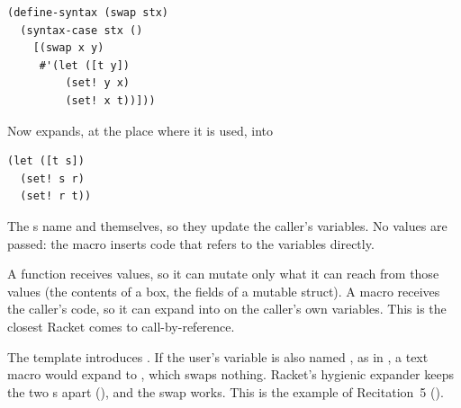 \begin{lstlisting}
(define-syntax (swap stx)
  (syntax-case stx ()
    [(swap x y)
     #'(let ([t y])
         (set! y x)
         (set! x t))]))
\end{lstlisting}
Now  expands, at the place where it is used, into
\begin{lstlisting}
(let ([t s])
  (set! s r)
  (set! r t))
\end{lstlisting}
The s name  and  themselves, so they update the caller's variables. No values are passed: the macro inserts code that refers to the variables directly.

\begin{keypoint}
A function receives values, so it can mutate only what it can reach from those values (the contents of a box, the fields of a mutable struct). A macro receives the caller's code, so it can expand into  on the caller's own variables. This is the closest Racket comes to call-by-reference.
\end{keypoint}

\begin{remark}
The template introduces . If the user's variable is also named , as in , a text macro would expand to , which swaps nothing. Racket's hygienic expander keeps the two s apart (), and the swap works. This is the  example of Recitation~5 ().
\end{remark}
